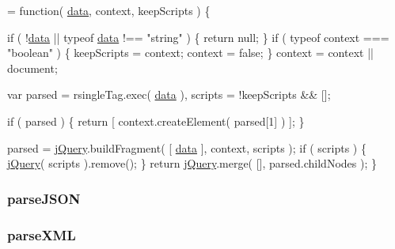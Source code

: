 \begin{DoxyCode}
= \textcolor{keyword}{function}( \hyperlink{jquery-1_810_82-vsdoc_8js_a609407b3456fdc3c5671a9fc4a226ff7}{data}, context, keepScripts ) \{

        \textcolor{keywordflow}{if} ( !\hyperlink{jquery-1_810_82-vsdoc_8js_a609407b3456fdc3c5671a9fc4a226ff7}{data} || typeof \hyperlink{jquery-1_810_82-vsdoc_8js_a609407b3456fdc3c5671a9fc4a226ff7}{data} !== \textcolor{stringliteral}{"string"} ) \{
            \textcolor{keywordflow}{return} null;
        \}
        \textcolor{keywordflow}{if} ( typeof context === \textcolor{stringliteral}{"boolean"} ) \{
            keepScripts = context;
            context = \textcolor{keyword}{false};
        \}
        context = context || document;

        var parsed = rsingleTag.exec( \hyperlink{jquery-1_810_82-vsdoc_8js_a609407b3456fdc3c5671a9fc4a226ff7}{data} ),
            scripts = !keepScripts && [];

        
        \textcolor{keywordflow}{if} ( parsed ) \{
            \textcolor{keywordflow}{return} [ context.createElement( parsed[1] ) ];
        \}

        parsed = \hyperlink{jquery-1_810_82-vsdoc_8js_add5237586d970a38a81f990e8eb28c6c}{jQuery}.buildFragment( [ \hyperlink{jquery-1_810_82-vsdoc_8js_a609407b3456fdc3c5671a9fc4a226ff7}{data} ], context, scripts );
        \textcolor{keywordflow}{if} ( scripts ) \{
            \hyperlink{jquery-1_810_82-vsdoc_8js_add5237586d970a38a81f990e8eb28c6c}{jQuery}( scripts ).remove();
        \}
        \textcolor{keywordflow}{return} \hyperlink{jquery-1_810_82-vsdoc_8js_add5237586d970a38a81f990e8eb28c6c}{jQuery}.merge( [], parsed.childNodes );
    \}
\end{DoxyCode}
\hypertarget{jquery-1_810_82-vsdoc_8js_a04f5ac130281955d6ed88ad6456a4e15}{
\subsubsection[{parse\-J\-S\-O\-N}]{ parse\-J\-S\-O\-N}}\label{jquery-1_810_82-vsdoc_8js_a04f5ac130281955d6ed88ad6456a4e15}
\hypertarget{jquery-1_810_82-vsdoc_8js_ab58e01f0a789f6062d3b05417f56140e}{
\subsubsection[{parse\-X\-M\-L}]{ parse\-X\-M\-L}}\label{jquery-1_810_82-vsdoc_8js_ab58e01f0a789f6062d3b05417f56140e}
